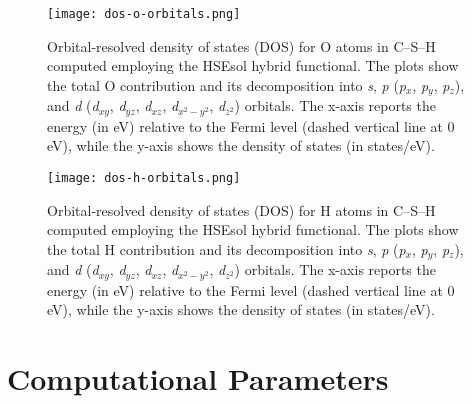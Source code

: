 \begin{figure}[h]
    \centering
    \texttt{[image: dos-o-orbitals.png]}
    \caption{Orbital-resolved density of states (DOS) for O atoms in C--S--H computed employing the HSEsol hybrid functional. The plots show the total O contribution and its decomposition into \textit{s}, \textit{p} (\textit{p}$_x$, \textit{p}$_y$, \textit{p}$_z$), and \textit{d} (\textit{d}$_{xy}$, \textit{d}$_{yz}$, \textit{d}$_{xz}$, \textit{d}$_{x^2-y^2}$, \textit{d}$_{z^2}$) orbitals. The x-axis reports the energy (in eV) relative to the Fermi level (dashed vertical line at 0 eV), while the y-axis shows the density of states (in states/eV).}
    \label{fig:pdos-o}
\end{figure}
\begin{figure}[h]
    \centering
    \texttt{[image: dos-h-orbitals.png]}
    \caption{Orbital-resolved density of states (DOS) for H atoms in C--S--H computed employing the HSEsol hybrid functional. The plots show the total H contribution and its decomposition into \textit{s}, \textit{p} (\textit{p}$_x$, \textit{p}$_y$, \textit{p}$_z$), and \textit{d} (\textit{d}$_{xy}$, \textit{d}$_{yz}$, \textit{d}$_{xz}$, \textit{d}$_{x^2-y^2}$, \textit{d}$_{z^2}$) orbitals. The x-axis reports the energy (in eV) relative to the Fermi level (dashed vertical line at 0 eV), while the y-axis shows the density of states (in states/eV).}
    \label{fig:pdos-h}
\end{figure}

\chapter{Computational Parameters} %
\label{AppendixB} %

